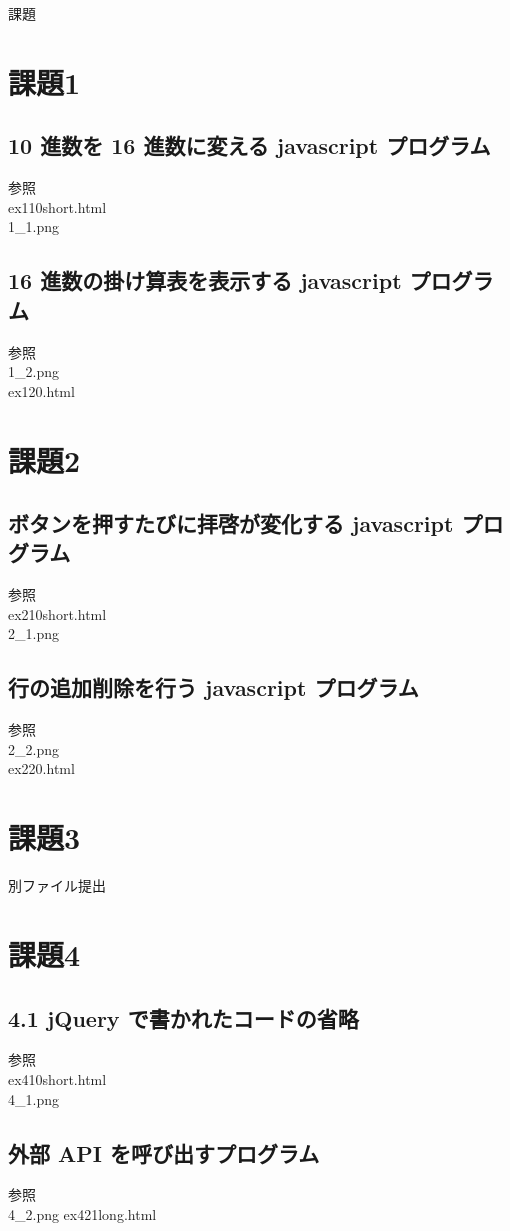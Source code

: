 \documentclass[a4j]{jarticle}
\begin{document}
{\rm \huge 課題}
  \section{課題1}
    \subsection{ 10 進数を 16 進数に変える javascript プログラム}
      参照\\
      ex110short.html\\
      1\_1.png
    \subsection{16 進数の掛け算表を表示する javascript プログラム}
      参照\\
      1\_2.png\\
      ex120.html
  \section{課題2}
    \subsection{ボタンを押すたびに拝啓が変化する javascript プログラム}
      参照\\
      ex210short.html\\
      2\_1.png
    \subsection{行の追加削除を行う javascript プログラム}
        参照\\
      2\_2.png\\
      ex220.html
  \section{課題3}
    別ファイル提出
  \section{課題4}
    \subsection{4.1 jQuery で書かれたコードの省略}
      参照\\
      ex410short.html\\
      4\_1.png
    \subsection{外部 API を呼び出すプログラム}
      参照\\
      4\_2.png
      ex421long.html
\end{document}
